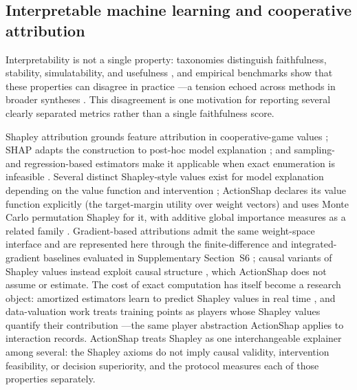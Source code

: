 \documentclass[a4paper,fleqn,doubleblind]{cas-sc}
\begin{document}
\subsection{Interpretable machine learning and cooperative attribution}
Interpretability is not a single property: taxonomies distinguish faithfulness, stability, simulatability, and usefulness \citep{gilpin2018,arrieta2020}, and empirical benchmarks show that these properties can disagree in practice \citep{samek2017,deyoung2020}---a tension echoed across methods in broader syntheses \citep{molnar2022}. This disagreement is one motivation for reporting several clearly separated metrics rather than a single faithfulness score.

Shapley attribution grounds feature attribution in cooperative-game values \citep{shapley1953}; SHAP adapts the construction to post-hoc model explanation \citep{lundberg2017,lundberg2020}; and sampling- and regression-based estimators make it applicable when exact enumeration is infeasible \citep{castro2009,covert2021,okhrani2021multilinear}. Several distinct Shapley-style values exist for model explanation depending on the value function and intervention \citep{sundararajan2020many}; ActionShap declares its value function explicitly (the target-margin utility over weight vectors) and uses Monte Carlo permutation Shapley for it, with additive global importance measures as a related family \citep{covert2020sage}. Gradient-based attributions admit the same weight-space interface and are represented here through the finite-difference and integrated-gradient baselines evaluated in Supplementary Section~S6 \citep{ancona2019unified}; causal variants of Shapley values instead exploit causal structure \citep{heskes2020causal}, which ActionShap does not assume or estimate. The cost of exact computation has itself become a research object: amortized estimators learn to predict Shapley values in real time \citep{jethani2022fastshap}, and data-valuation work treats training points as players whose Shapley values quantify their contribution \citep{ghorbani2019datashapley}---the same player abstraction ActionShap applies to interaction records. ActionShap treats Shapley as one interchangeable explainer among several: the Shapley axioms do not imply causal validity, intervention feasibility, or decision superiority, and the protocol measures each of those properties separately.
\end{document}
